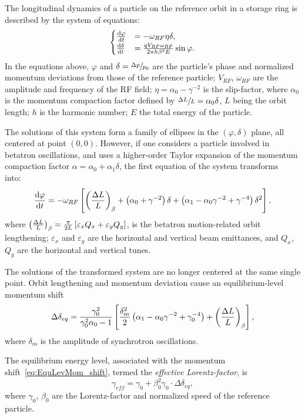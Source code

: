 \documentclass[a4paper]{jacow}
\newcommand{\w}{\omega}
\begin{document}
The longitudinal dynamics of a particle on the reference orbit in a storage ring is described by the system of equations:
\begin{equation}
  \begin{cases}
    \ddt{\varphi} &= -\w_{RF}\eta\delta, \\
    \ddt{\delta} &= \frac{q V_{RF}\w_{RF}}{2\pi h\beta^2E}\sin\varphi.
  \end{cases}
\end{equation}
In the equations above, $\varphi$ and  $\delta = \sfrac{\Delta p}{p_0}$ are the particle's phase and normalized momentum deviations from those of the reference particle; $V_{RF}$, $\w_{RF}$ are the amplitude and frequency of the RF field; $\eta = \alpha_0 - \gamma^{-2}$ is the slip-factor, where $\alpha_0$ is the momentum compaction factor defined by $\sfrac{\Delta L}{L} = \alpha_0\delta$, $L$ being the orbit length; $h$ is the harmonic number; $E$ the total energy of the particle.

The solutions of this system form a family of ellipses in the $(\varphi, \delta)$ plane, all centered at point $(0,0)$. However, if one considers a particle involved in betatron oscillations, and uses a higher-order Taylor expansion of the momentum compaction factor $\alpha = \alpha_0 + \alpha_1\delta$, the first equation of the system transforms into:~\cite[p.~2579]{Senichev:IPAC13}
\[
\ddt{\varphi} = -\w_{RF} \bkt*{\bkt{\frac{\Delta L}{L}}_\beta + \bkt{\alpha_0 + \gamma^{-2}}\delta + \bkt{\alpha_1 - \alpha_0\gamma^{-2} + \gamma^{-4}}\delta^2},
\]
where $\bkt{\frac{\Delta L}{L}}_\beta = \frac{\pi}{2L}\bkt*{\varepsilon_xQ_x + \varepsilon_yQ_y}$, is the betatron motion-related orbit lengthening; $\varepsilon_x$ and $\varepsilon_y$ are the horizontal and vertical beam emittances, and $Q_x$, $Q_y$ are the horizontal and vertical tunes.

The solutions of the transformed system are no longer centered at the same single point. Orbit lengthening and momentum deviation cause an equilibrium-level momentum shift~\cite[p.~2581]{Senichev:IPAC13}
\begin{equation}\label{eq:EquLevMom_shift}
\Delta\delta_{eq} = \frac{\gamma_0^2}{\gamma_0^2\alpha_0 - 1}\bkt*{\frac{\delta_m^2}{2}\bkt{\alpha_1 - \alpha_0\gamma^{-2} + \gamma_0^{-4}} + \bkt{\frac{\Delta L}{L}}_\beta},
\end{equation}
where $\delta_m$ is the amplitude of synchrotron oscillations.

The equilibrium energy level, associated with the momentum shift~\eqref{eq:EquLevMom_shift}, termed the \emph{effective Lorentz-factor}, is\cite{Senichev:FDM}
\begin{equation}\label{eq:EffectiveGamma}
\gamma_{eff} = \gamma_0 + \beta_0^2\gamma_0\cdot\Delta\delta_{eq},
\end{equation}
where $\gamma_0$, $\beta_0$ are the Lorentz-factor and normalized speed of the reference particle.
\end{document}
